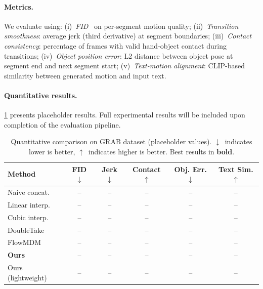 \documentclass[runningheads]{llncs}
\begin{document}
\paragraph{Metrics.}
We evaluate using: (i)~\emph{FID}~\cite{heusel2017gans} on per-segment motion quality; (ii)~\emph{Transition smoothness}: average jerk (third derivative) at segment boundaries; (iii)~\emph{Contact consistency}: percentage of frames with valid hand-object contact during transitions; (iv)~\emph{Object position error}: L2 distance between object pose at segment end and next segment start; (v)~\emph{Text-motion alignment}: CLIP-based similarity between generated motion and input text.

\paragraph{Quantitative results.}
\cref{tab:results} presents placeholder results.
Full experimental results will be included upon completion of the evaluation pipeline.

\begin{table}[t]
  \caption{Quantitative comparison on GRAB dataset (placeholder values). $\downarrow$~indicates lower is better, $\uparrow$~indicates higher is better. Best results in \textbf{bold}.}
  \label{tab:results}
  \centering
  \begin{tabular}{@{}lccccc@{}}
    \toprule
    Method & FID $\downarrow$ & Jerk $\downarrow$ & Contact $\uparrow$ & Obj. Err. $\downarrow$ & Text Sim. $\uparrow$ \\
    \midrule
    Naive concat.    & -- & -- & -- & -- & -- \\
    Linear interp.   & -- & -- & -- & -- & -- \\
    Cubic interp.    & -- & -- & -- & -- & -- \\
    DoubleTake~\cite{shafir2024doubletake} & -- & -- & -- & -- & -- \\
    FlowMDM~\cite{barquero2024seamless}   & -- & -- & -- & -- & -- \\
    \midrule
    \textbf{Ours}    & -- & -- & -- & -- & -- \\
    Ours (lightweight) & -- & -- & -- & -- & -- \\
    \bottomrule
  \end{tabular}
\end{table}


\end{document}
